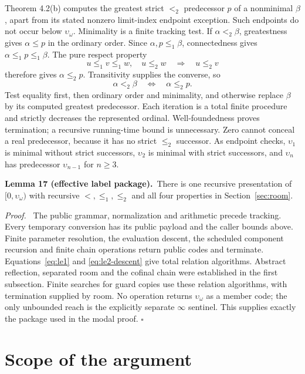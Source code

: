 \documentclass[11pt]{article}
\newcommand{\up}{\upsilon}
\newcommand{\qed}{\hfill\ensuremath{\square}}
\newenvironment{proof}{\par\emph{Proof.}\ }{\qed\par}
\newcommand{\statement}[2]{\par\textbf{#1.}\ #2\par}
\begin{document}
Theorem 4.2(b) computes the greatest strict $<_2$ predecessor
$p$ of a nonminimal $\beta$, apart from its stated nonzero
limit-index endpoint exception. Such endpoints do not occur
below $\up_\omega$. Minimality is a finite tracking test.
If $\alpha<_2\beta$, greatestness gives $\alpha\le p$ in the
ordinary order. Since $\alpha,p\le_1\beta$, connectedness gives
$\alpha\le_1p\le_1\beta$. The pure respect property
\[
 u\le_1v\le_1w,\quad u\le_2w\quad\Longrightarrow\quad u\le_2v
\]
therefore gives $\alpha\le_2p$. Transitivity supplies the converse,
so
\begin{equation}\label{eq:le2-descent}
 \alpha<_2\beta\quad\Longleftrightarrow\quad\alpha\le_2p.
\end{equation}
Test equality first, then ordinary order and minimality, and otherwise
replace $\beta$ by its computed greatest predecessor. Each iteration
is a total finite procedure and strictly decreases the represented
ordinal. Well-foundedness proves termination; a recursive running-time
bound is unnecessary. Zero cannot conceal a real predecessor, because
it has no strict $\le_2$ successor. As endpoint checks,
$\up_1$ is minimal without strict successors, $\up_2$ is minimal
with strict successors, and $\up_n$ has predecessor $\up_{n-1}$
for $n\ge3$.

\statement{Lemma 17 (effective label package)}{There is one recursive
presentation of $[0,\up_\omega)$ with recursive $<,\le_1,\le_2$
and all four properties in Section~\ref{sec:room}.}

\begin{proof}
The public grammar, normalization and arithmetic precede tracking.
Every temporary conversion has its public payload and the caller
bounds above. Finite parameter resolution, the evaluation descent,
the scheduled component recursion and finite chain operations return
public codes and terminate. Equations~\eqref{eq:le1} and
\eqref{eq:le2-descent} give total relation algorithms. Abstract
reflection, separated room and the cofinal chain were established
in the first subsection. Finite searches for guard copies use these
relation algorithms, with termination supplied by room. No operation
returns $\up_\omega$ as a member code; the only unbounded reach
is the explicitly separate $\infty$ sentinel. This supplies exactly
the package used in the modal proof.
\end{proof}

\section*{Scope of the argument}
\end{document}
